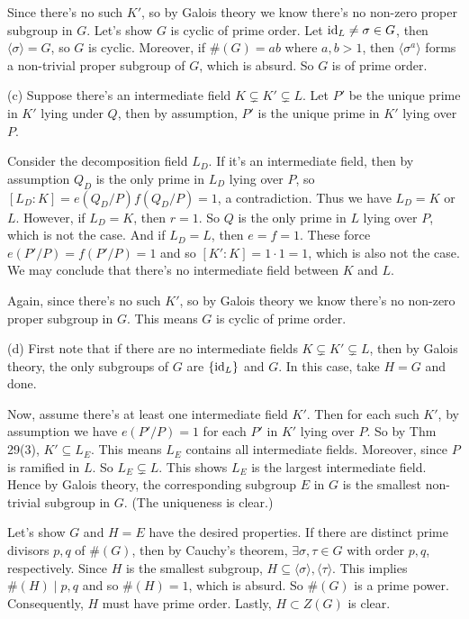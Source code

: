 \documentclass[../Marcus.tex]{subfiles}
\begin{document}
Since there's no such $K'$, so by Galois theory we know there's no non-zero proper subgroup in $G$. Let's show $G$ is cyclic of prime order. Let $\operatorname{id}_L\neq\sigma\in G$, then $\langle\sigma\rangle=G$, so $G$ is cyclic. Moreover, if $\#(G)=ab$ where $a,b>1$, then $\langle\sigma^a\rangle$ forms a non-trivial proper subgroup of $G$, which is absurd. So $G$ is of prime order.

(c) Suppose there's an intermediate field $K\varsubsetneq K'\varsubsetneq L$. Let $P'$ be the unique prime in $K'$ lying under $Q$, then by assumption, $P'$ is the unique prime in $K'$ lying over $P$.

Consider the decomposition field $L_D$. If it's an intermediate field, then by assumption $Q_D$ is the only prime in $L_D$ lying over $P$, so $[L_D:K]=e(Q_D/P)f(Q_D/P)=1$, a contradiction. Thus we have $L_D=K$ or $L$. However, if $L_D=K$, then $r=1$. So $Q$ is the only prime in $L$ lying over $P$, which is not the case. And if $L_D=L$, then $e=f=1$. These force $e(P'/P)=f(P'/P)=1$ and so $[K':K]=1\cdot 1=1$, which is also not the case. We may conclude that there's no intermediate field between $K$ and $L$.

Again, since there's no such $K'$, so by Galois theory we know there's no non-zero proper subgroup in $G$. This means $G$ is cyclic of prime order.

(d) First note that if there are no intermediate fields $K\varsubsetneq K'\varsubsetneq L$, then by Galois theory, the only subgroups of $G$ are $\{\operatorname{id}_L\}$ and $G$. In this case, take $H=G$ and done.

Now, assume there's at least one intermediate field $K'$. Then for each such $K'$, by assumption we have $e(P'/P)=1$ for each $P'$ in $K'$ lying over $P$. So by Thm 29(3), $K'\subseteq L_E$. This means $L_E$ contains all intermediate fields. Moreover, since $P$ is ramified in $L$. So $L_E\varsubsetneq L$. This shows $L_E$ is the largest intermediate field. Hence by Galois theory, the corresponding subgroup $E$ in $G$ is the smallest non-trivial subgroup in $G$. (The uniqueness is clear.)

Let's show $G$ and $H=E$ have the desired properties. If there are distinct prime divisors $p,q$ of $\#(G)$, then by Cauchy's theorem, $\exists \sigma,\tau\in G$ with order $p,q$, respectively. Since $H$ is the smallest subgroup, $H\subseteq \langle\sigma\rangle,\langle\tau\rangle$. This implies $\#(H)\mid p,q$ and so $\#(H)=1$, which is absurd. So $\#(G)$ is a prime power. Consequently, $H$ must have prime order. Lastly, $H\subset Z(G)$ is clear.
\end{document}
